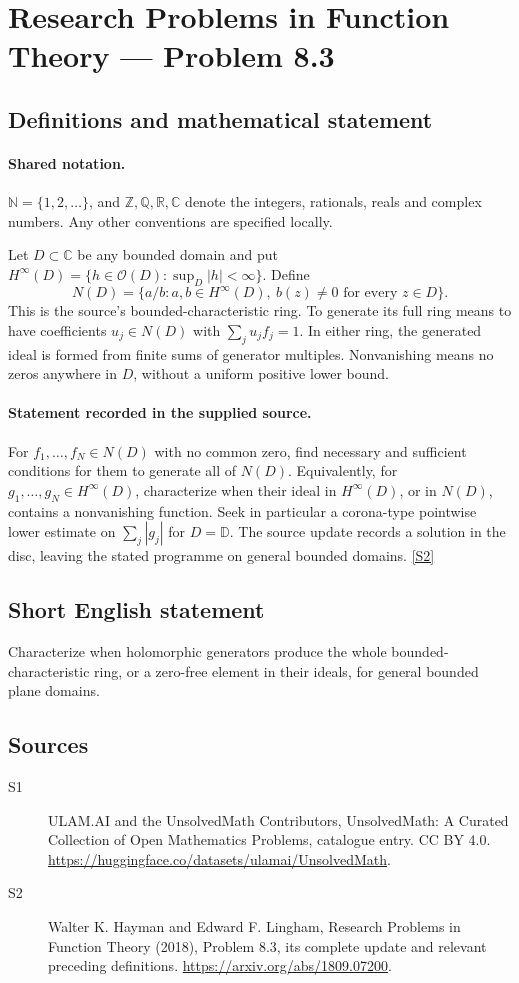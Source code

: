 \documentclass[11pt]{article}
\newcommand{\sref}[2]{\hyperlink{source:#1:#2}{[S#2]}}
\begin{document}
\section{Research Problems in Function Theory — Problem 8.3}\label{statement}

\subsection{Definitions and mathematical statement}

\paragraph{Shared notation.}$\mathbb N=\{1,2,\ldots\}$, and $\mathbb Z,\mathbb Q,\mathbb R,\mathbb C$ denote the integers, rationals, reals and complex numbers. Any other conventions are specified locally.


Let $D\subset\mathbb C$ be any bounded domain and put $H^\infty(D)=\{h\in\mathcal O(D):\sup_D|h|<\infty\}$. Define
\[N(D)=\{a/b:a,b\in H^\infty(D),\ b(z)\ne0\text{ for every }z\in D\}.
\]
This is the source's bounded-characteristic ring. To generate its full ring means to have coefficients $u_j\in N(D)$ with $\sum_j u_jf_j=1$. In either ring, the generated ideal is formed from finite sums of generator multiples. Nonvanishing means no zeros anywhere in $D$, without a uniform positive lower bound.
\paragraph{Statement recorded in the supplied source.}
For $f_1,\ldots,f_N\in N(D)$ with no common zero, find necessary and sufficient conditions for them to generate all of $N(D)$. Equivalently, for $g_1,\ldots,g_N\in H^\infty(D)$, characterize when their ideal in $H^\infty(D)$, or in $N(D)$, contains a nonvanishing function. Seek in particular a corona-type pointwise lower estimate on $\sum_j|g_j|$ for $D=\mathbb D$. The source update records a solution in the disc, leaving the stated programme on general bounded domains. \sref{statement}{2}
\subsection{Short English statement}
Characterize when holomorphic generators produce the whole bounded-characteristic ring, or a zero-free element in their ideals, for general bounded plane domains.
\subsection{Sources}
\begin{description}
\item[\hypertarget{source:statement:1}{S1}] ULAM.AI and the UnsolvedMath Contributors, UnsolvedMath: A Curated Collection of Open Mathematics Problems, catalogue entry. CC BY 4.0. \url{https://huggingface.co/datasets/ulamai/UnsolvedMath}.
\item[\hypertarget{source:statement:2}{S2}] Walter K. Hayman and Edward F. Lingham, Research Problems in Function Theory (2018), Problem 8.3, its complete update and relevant preceding definitions. \url{https://arxiv.org/abs/1809.07200}.
\end{description}
\label{end:statement}
\end{document}
